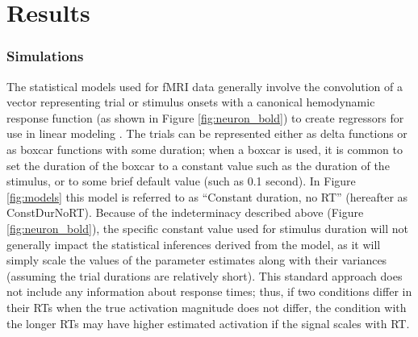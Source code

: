 \documentclass[titlepage,12pt] {article}
\begin{document}
\section*{Results}

\subsubsection*{Simulations}

The statistical models used for fMRI data generally involve the convolution of a vector representing trial or stimulus onsets with a canonical hemodynamic response function (as shown in Figure \ref{fig:neuron_bold})  to create regressors for use in linear modeling \citep{PoldrackMumfordNichols2009}.  The trials can be represented either as delta functions or as boxcar functions with some duration; when a boxcar is used, it is common to set the duration of the boxcar to a constant value such as the duration of the stimulus, or to some brief default value (such as 0.1 second).  In Figure \ref{fig:models} this model is referred to as ``Constant duration, no RT'' (hereafter as ConstDurNoRT).  Because of the indeterminacy described above (Figure \ref{fig:neuron_bold}), the specific constant value used for stimulus duration will not generally impact the statistical inferences derived from the model, as it will simply scale the values of the parameter estimates along with their variances (assuming the trial durations are relatively short).   This standard approach does not include any information about response times; thus, if two conditions differ in their RTs when the true activation magnitude does not differ, the condition with the longer RTs may have higher estimated activation if the signal scales with RT.  
\end{document}
